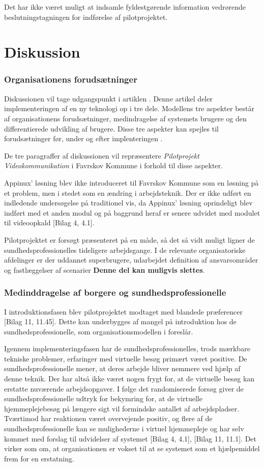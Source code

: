 Det har ikke været muligt at indsamle fyldestgørende information vedrørende beslutningstagningen for indførelse af pilotprojektet.

  
\section{Diskussion}
\subsubsection{Organisationens forudsætninger}
Diskussionen vil tage udgangspunkt i artiklen . Denne artikel deler implementeringen af en ny teknologi op i tre dele. Modellens tre aspekter består af organisationens forudsætninger, medindragelse af systemets brugere og den differentierede udvikling af brugere. Disse tre aspekter kan spejles til forudsætninger før, under og efter implenteringen \cite{Ikt}. 

De tre paragraffer af diskussionen vil repræsentere \textit{Pilotprojekt Videokommunikation} i Favrskov Kommune i forhold til disse aspekter. 

Appinux’ løsning blev ikke introduceret til Favrskov Kommune som en løsning på et problem, men i stedet som en ændring i arbejdsteknik. Der er ikke udført en indledende undersøgelse på traditionel vis, da Appinux' løsning oprindeligt blev indført med et anden modul og på baggrund heraf er senere udvidet med modulet til videoopkald [Bilag 4, 4.1].

Pilotprojektet er forsøgt præsenteret på en måde, så det så vidt muligt ligner de sundhedsprofessionelles tideligere arbejdsgange. I de relevante organisatoriske afdelinger er der uddannet superbrugere, udarbejdet definition af ansvarsområder og fastlæggelser af scenarier \textbf{Denne del kan muligvis slettes}. 

\subsubsection{Medinddragelse af borgere og sundhedsprofessionelle}
I introduktionsfasen blev pilotprojektet modtaget med blandede præferencer [Bilag 11, 11.45]. Dette kan underbygges af mangel på introduktion hos de sundhedsprofessionelle, som organisationsmodellen i  foreslår. 

Igennem implementeringsfasen har de sundhedsprofessionelles, trods mærkbare tekniske problemer, erfaringer med virtuelle besøg primært været positive. De sundhedsprofessionelle mener, at deres arbejde bliver nemmere ved hjælp af denne teknik. Der har altså ikke været nogen frygt for, at de virtuelle besøg kan erstatte nuværende arbejdsopgaver. I følge det randomiserede forsøg  giver de sundhedsprofessionelle udtryk for bekymring for, at de virtuelle hjemmeplejebesøg på længere sigt vil formindske antallet af arbejdspladser. Tværtimod har reaktionen været overvejende positiv, og flere af de sundhedsprofessionelle kan se mulighederne i virtuel hjemmepleje og har selv kommet med forslag til udvidelser af systemet [Bilag 4, 4.1], [Bilag 11, 11.1]. Det virker som om, at organisationen er vokset til at se systemet som et hjælpemiddel frem for en erstatning.

